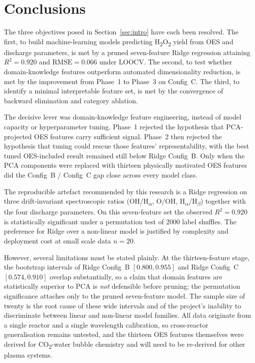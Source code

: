 \documentclass[12pt, a4paper]{article}
\begin{document}
\newpage
\section{Conclusions}
\label{sec:conclusions}

The three objectives posed in Section~\ref{sec:intro} have each been resolved. The first, to build machine-learning models predicting H\textsubscript{2}O\textsubscript{2} yield from OES and discharge parameters, is met by a pruned seven-feature Ridge regression attaining $R^2 = 0.920$ and $\mathrm{RMSE} = 0.066$ under LOOCV. The second, to test whether domain-knowledge features outperform automated dimensionality reduction, is met by the improvement from Phase~1 to Phase~3 on Config~C. The third, to identify a minimal interpretable feature set, is met by the convergence of backward elimination and category ablation.

The decisive lever was domain-knowledge feature engineering, instead of model capacity or hyperparameter tuning. Phase~1 rejected the hypothesis that PCA-projected OES features carry sufficient signal. Phase~2 then rejected the hypothesis that tuning could rescue those features' representability, with the best tuned OES-included result remained still below Ridge Config~B. Only when the PCA components were replaced with thirteen physically motivated OES features did the Config~B / Config~C gap close across every model class.

The reproducible artefact recommended by this research is a Ridge regression on three drift-invariant spectroscopic ratios (OH/H\textsubscript{$\alpha$}, O/OH, H\textsubscript{$\alpha$}/H\textsubscript{$\beta$}) together with the four discharge parameters. On this seven-feature set the observed $R^2 = 0.920$ is statistically significant under a permutation test of 2000 label shuffles. The preference for Ridge over a non-linear model is justified by complexity and deployment cost at small scale data $n=20$.

However, several limitations must be stated plainly. At the thirteen-feature stage, the bootstrap intervals of Ridge Config~B $[0.800, 0.955]$ and Ridge Config~C $[0.574, 0.910]$ overlap substantially, so a claim that domain features are statistically superior to PCA is \emph{not} defensible before pruning; the permutation significance attaches only to the pruned seven-feature model. The sample size of twenty is the root cause of these wide intervals and of the project's inability to discriminate between linear and non-linear model families. All data originate from a single reactor and a single wavelength calibration, so cross-reactor generalisation remains untested, and the thirteen OES features themselves were derived for CO\textsubscript{2}-water bubble chemistry and will need to be re-derived for other plasma systems.
\end{document}
